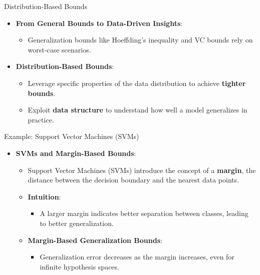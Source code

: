 \documentclass[
  ignorenonframetext,
]{beamer}
\providecommand{\tightlist}{%
  \setlength{\itemsep}{0pt}\setlength{\parskip}{0pt}}\usepackage{longtable,booktabs,array}
\begin{document}
\begin{frame}{Distribution-Based Bounds}
\label{distribution-based-bounds}
\begin{itemize}
\tightlist
\item
  \textbf{From General Bounds to Data-Driven Insights}:

  \begin{itemize}
  \tightlist
  \item
    Generalization bounds like Hoeffding's inequality and VC bounds rely
    on worst-case scenarios.
  \end{itemize}
\item
  \textbf{Distribution-Based Bounds}:

  \begin{itemize}
  \tightlist
  \item
    Leverage specific properties of the data distribution to achieve
    \textbf{tighter bounds}.
  \item
    Exploit \textbf{data structure} to understand how well a model
    generalizes in practice.
  \end{itemize}
\end{itemize}
\end{frame}

\begin{frame}{Example: Support Vector Machines (SVMs)}
\label{example-support-vector-machines-svms}
\begin{itemize}
\tightlist
\item
  \textbf{SVMs and Margin-Based Bounds}:

  \begin{itemize}
  \tightlist
  \item
    Support Vector Machines (SVMs) introduce the concept of a
    \textbf{margin}, the distance between the decision boundary and the
    nearest data points.
  \item
    \textbf{Intuition}:

    \begin{itemize}
    \tightlist
    \item
      A larger margin indicates better separation between classes,
      leading to better generalization.
    \end{itemize}
  \item
    \textbf{Margin-Based Generalization Bounds}:

    \begin{itemize}
    \tightlist
    \item
      Generalization error decreases as the margin increases, even for
      infinite hypothesis spaces.
    \end{itemize}
  \end{itemize}
\end{itemize}
\end{frame}
\end{document}
